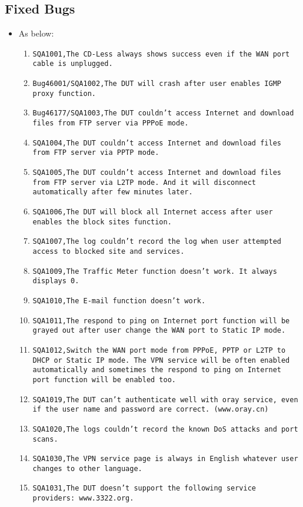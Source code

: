 \documentclass[12pt]{report}
\begin{document}
    \subsection{Fixed Bugs}
    \begin{itemize}
    \item As below:
    	\begin{enumerate}
		\item \texttt{SQA1001,The CD-Less always shows success even if the WAN port cable is unplugged.}
		\item \texttt{Bug46001/SQA1002,The DUT will crash after user enables IGMP proxy function.}
		\item \texttt{Bug46177/SQA1003,The DUT couldn't access Internet and download files from FTP server via PPPoE mode.}
		\item \texttt{SQA1004,The DUT couldn't access Internet and download files from FTP server via PPTP mode.}
		\item \texttt{SQA1005,The DUT couldn't access Internet and download files from FTP server via L2TP mode. And it will disconnect automatically after few minutes later.}
		\item \texttt{SQA1006,The DUT will block all Internet access after user enables the block sites function.}
		\item \texttt{SQA1007,The log couldn't record the log when user attempted access to blocked site and services.}
		\item \texttt{SQA1009,The Traffic Meter function doesn't work. It always displays 0.}
		\item \texttt{SQA1010,The E-mail function doesn't work.}
		\item \texttt{SQA1011,The respond to ping on Internet port function will be grayed out after user change the WAN port to Static IP mode.}
		\item \texttt{SQA1012,Switch the WAN port mode from PPPoE, PPTP or L2TP to DHCP or Static IP mode. The VPN service will be often enabled automatically and sometimes the respond to ping on Internet port function will be enabled too.}
		\item \texttt{SQA1019,The DUT can't authenticate well with oray service, even if the user name and password are correct. (www.oray.cn)}
		\item \texttt{SQA1020,The logs couldn't record the known DoS attacks and port scans.}
		\item \texttt{SQA1030,The VPN service page is always in English whatever user changes to other language.}
		\item \texttt{SQA1031,The DUT doesn't support the following service providers: www.3322.org.}

\end{enumerate}
\end{itemize}
\end{document}
